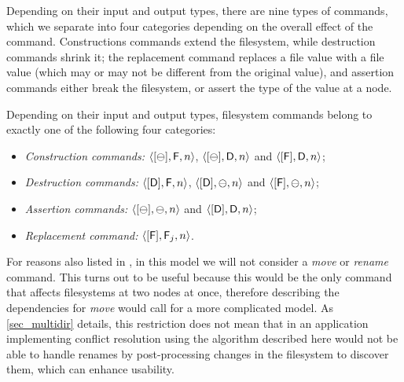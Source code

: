 \myskip
Depending on their input and output types, there are nine types of commands,
which we separate into four categories depending on the overall effect of the command.
Constructions commands extend the filesystem,
while destruction commands shrink it;
the replacement command replaces a file value with a file value
(which may or may not be different from the original value),
and assertion commands either break the filesystem, or assert the type of the value at a node.
\begin{mydef}
Depending on their input and output types, filesystem commands
belong to exactly one of the following four categories:
\begin{itemize}
\item[]\emph{Construction commands:}
    $\langle{[\ominus],\mathsf{F},n}\rangle$, $\langle{[\ominus],\mathsf{D},n}\rangle$ and $\langle{[\mathsf{F}],\mathsf{D},n}\rangle$;
\item[]\emph{Destruction commands:}
    $\langle{[\mathsf{D}],\mathsf{F},n}\rangle$, $\langle{[\mathsf{D}],\ominus,n}\rangle$ and $\langle{[\mathsf{F}],\ominus,n}\rangle$;
\item[]\emph{Assertion commands:}
    $\langle{[\ominus],\ominus,n}\rangle$ and $\langle{[\mathsf{D}],\mathsf{D},n}\rangle$;
\item[]\emph{Replacement command:}
    $\langle{[\mathsf{F}],\mathsf{F}_j,n}\rangle$.
\qedhere
\end{itemize}
\end{mydef}



\myskip
For reasons also listed in \cite{NREC}, in this model we will not consider
a \textit{move} or \textit{rename} command.
This turns out to be useful because this would be the only command that affects
filesystems at two nodes at once, therefore describing 
the dependencies for \textit{move} would call for a more complicated model.
As \cref{sec_multidir} details, this restriction does not mean that in an application
implementing conflict resolution using the algorithm described here would not be
able to handle renames by post-processing changes in the filesystem to
discover them, which can enhance usability.
